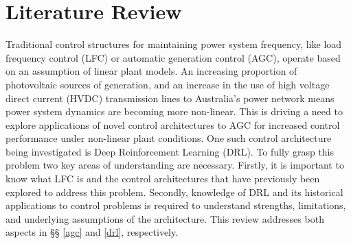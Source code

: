 \section{Literature Review}
Traditional control structures for maintaining power system frequency, like load frequency control (LFC) or automatic generation control (AGC), operate based on an assumption of linear plant models. An increasing proportion of photovoltaic sources of generation, and an increase in the use of high voltage direct current (HVDC) transmission lines to Australia's power network means power system dynamics are becoming more non-linear. This is driving a need to explore applications of novel control architectures to AGC for increased control performance under non-linear plant conditions. One such control architecture being investigated is Deep Reinforcement Learning (DRL). To fully grasp this problem two key areas of understanding are necessary. Firstly, it is important to know what LFC is and the control architectures that have previously been explored to address this problem. Secondly, knowledge of DRL and its historical applications to control problems is required to understand strengths, limitations, and underlying assumptions of the architecture. This review addresses both aspects in \S{}\S{} \ref{agc} and \ref{drl}, respectively.


